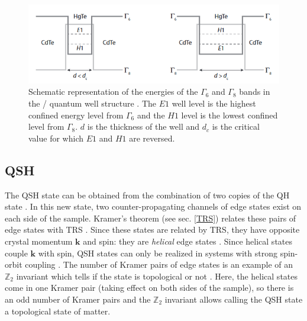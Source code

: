 

\begin{figure}[t]
    \includegraphics[width=\textwidth]{sections/visuel/Hg}
    \centering
    \caption{Schematic representation of the energies of the $\Gamma_6$ and $\Gamma_8$ bands in the / quantum well structure \cite{bernevig_topological_2013}. The  $E1$ well level is the highest confined energy level from $\Gamma_6$ and the $H1$ level is the lowest confined level from $\Gamma_8$. $d$ is the thickness of the well and $d_c$ is the critical value for which $E1$ and $H1$ are reversed.}
    \label{hg}
\end{figure}

\subsection{QSH}

The QSH state can be obtained from the combination of two copies of the QH state \cite{buhmann_quantum_2011}. In this new state, two counter-propagating channels of edge states exist on each side of the sample. Kramer's theorem (see sec. \ref{TRS}) relates these pairs of edge states with TRS \cite{buhmann_quantum_2011}. Since these states are related by TRS, they have opposite crystal momentum $\mathbf{k}$ and spin: they are \textit{helical} edge states \cite{bernevig_topological_2013}. Since helical states couple $\mathbf{k}$ with spin, QSH states can only be realized in systems with strong spin-orbit coupling \cite{qi_quantum_2010}. The number of Kramer pairs of edge states is an example of an $\mathbb{Z}_2$ invariant which tells if the state is topological or not \cite{koenig_quantum_2008}. Here, the helical states come in one Kramer pair (taking effect on both sides of the sample), so there is an odd number of Kramer pairs and the $\mathbb{Z}_2$ invariant allows calling the QSH state a topological state of matter.\\

